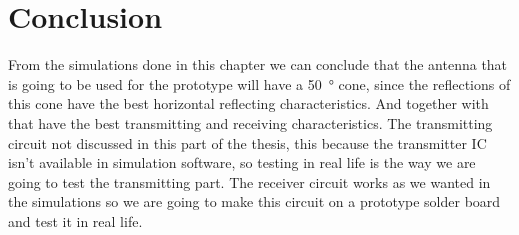 \section{Conclusion}
From the simulations done in this chapter we can conclude that the antenna that is going to be used for the prototype will have a \SI{50}{\degree} cone, since the reflections of this cone have the best horizontal reflecting characteristics. And together with that have the best transmitting and receiving characteristics.  The transmitting circuit not discussed in this part of the thesis, this because the transmitter IC \cite{MIC4428} isn't available in simulation software, so testing in real life is the way we are going to test the transmitting part. The receiver circuit works as we wanted in the simulations so we are going to make this circuit on a prototype solder board and test it in real life.
